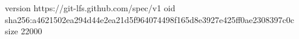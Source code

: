 version https://git-lfs.github.com/spec/v1
oid sha256:a4621502ea294d44e2ea21d5f964074498f165d8e3927e425ff0ae2308397c0c
size 22000
